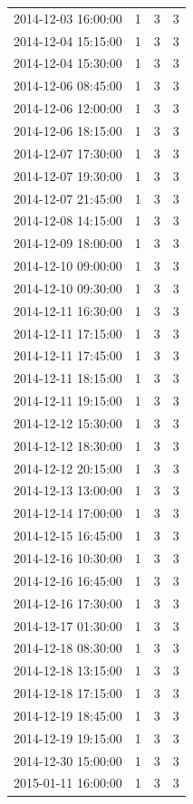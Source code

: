 \begin{tabular}{lrrr}
2014-12-03 16:00:00 & 1 & 3 & 3 \\
2014-12-04 15:15:00 & 1 & 3 & 3 \\
2014-12-04 15:30:00 & 1 & 3 & 3 \\
2014-12-06 08:45:00 & 1 & 3 & 3 \\
2014-12-06 12:00:00 & 1 & 3 & 3 \\
2014-12-06 18:15:00 & 1 & 3 & 3 \\
2014-12-07 17:30:00 & 1 & 3 & 3 \\
2014-12-07 19:30:00 & 1 & 3 & 3 \\
2014-12-07 21:45:00 & 1 & 3 & 3 \\
2014-12-08 14:15:00 & 1 & 3 & 3 \\
2014-12-09 18:00:00 & 1 & 3 & 3 \\
2014-12-10 09:00:00 & 1 & 3 & 3 \\
2014-12-10 09:30:00 & 1 & 3 & 3 \\
2014-12-11 16:30:00 & 1 & 3 & 3 \\
2014-12-11 17:15:00 & 1 & 3 & 3 \\
2014-12-11 17:45:00 & 1 & 3 & 3 \\
2014-12-11 18:15:00 & 1 & 3 & 3 \\
2014-12-11 19:15:00 & 1 & 3 & 3 \\
2014-12-12 15:30:00 & 1 & 3 & 3 \\
2014-12-12 18:30:00 & 1 & 3 & 3 \\
2014-12-12 20:15:00 & 1 & 3 & 3 \\
2014-12-13 13:00:00 & 1 & 3 & 3 \\
2014-12-14 17:00:00 & 1 & 3 & 3 \\
2014-12-15 16:45:00 & 1 & 3 & 3 \\
2014-12-16 10:30:00 & 1 & 3 & 3 \\
2014-12-16 16:45:00 & 1 & 3 & 3 \\
2014-12-16 17:30:00 & 1 & 3 & 3 \\
2014-12-17 01:30:00 & 1 & 3 & 3 \\
2014-12-18 08:30:00 & 1 & 3 & 3 \\
2014-12-18 13:15:00 & 1 & 3 & 3 \\
2014-12-18 17:15:00 & 1 & 3 & 3 \\
2014-12-19 18:45:00 & 1 & 3 & 3 \\
2014-12-19 19:15:00 & 1 & 3 & 3 \\
2014-12-30 15:00:00 & 1 & 3 & 3 \\
2015-01-11 16:00:00 & 1 & 3 & 3 \\

\end{tabular}
